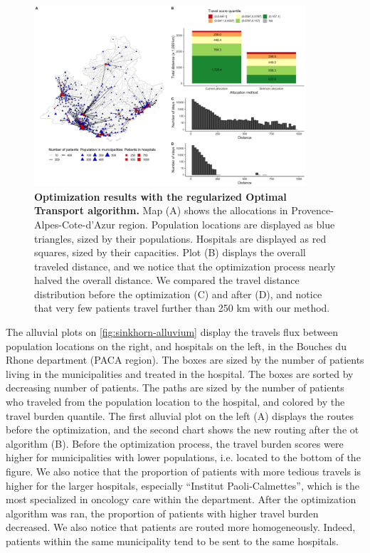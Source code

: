 \begin{figure}[h!]
    \includegraphics[width=0.9\textwidth]{images/routes/fig10.png}
    \centering
    \caption{ \textbf{Optimization results with the regularized Optimal
            Transport algorithm.} Map (A) shows the allocations in
        Provence-Alpes-Cote-d'Azur region. Population locations are displayed as
        blue triangles, sized by their populations. Hospitals are displayed as red
        squares, sized by their capacities. Plot (B) displays the overall traveled
        distance, and we notice that the optimization process nearly halved the
        overall distance. We compared the travel distance distribution before the optimization
        (C) and after (D), and notice that very few patients travel further than 250
        km with our method.}
    \label{fig:sinkhorn-distribution}
\end{figure}

The alluvial plots on \cref{fig:sinkhorn-alluvium} display the travels flux
between population locations on the right, and hospitals on the left, in the
Bouches du Rhone department (PACA region). The boxes are sized by the number of
patients living in the municipalities and treated in the hospital. The boxes are
sorted by decreasing number of patients. The paths are sized by the number of
patients who traveled from the population location to the hospital, and colored
by the travel burden quantile. The first alluvial plot on the left (A) displays
the routes before the optimization, and the second chart shows the new routing
after the \ac{ot} algorithm (B). Before the optimization process, the travel
burden scores were higher for municipalities with lower populations, i.e.
located to the bottom of the figure. We also notice that the proportion of
patients with more tedious travels is higher for the larger hospitals,
especially ``Institut Paoli-Calmettes'', which is the most specialized in
oncology care within the department. After the optimization algorithm was ran,
the proportion of patients with higher travel burden decreased. We also
notice that patients are routed more homogeneously. Indeed, patients within the
same municipality tend to be sent to the same hospitals.

